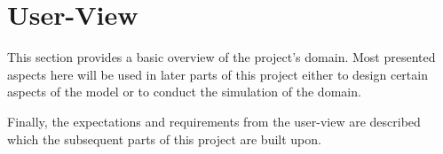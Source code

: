 \section{User-View}\label{sec:user-view}


This section provides a basic overview of the project's domain.
Most presented aspects here will be used in later parts of this project either to design certain aspects of the model
or to conduct the simulation of the domain.

Finally, the expectations and requirements from the user-view are described which the subsequent parts of this
project are built upon.